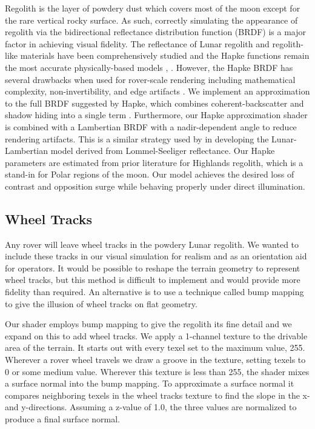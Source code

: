 \documentclass[twocolumn,letterpaper]{IEEEAerospaceCLS}  %
\begin{document}
Regolith is the layer of powdery dust which covers most of the moon except for the rare vertical rocky surface.  
As such, correctly simulating the appearance of regolith via the bidirectional reflectance distribution function (BRDF) is a major factor in achieving visual fidelity.  
The reflectance of Lunar regolith and regolith-like materials have been comprehensively studied and the Hapke functions remain the most accurate physically-based models \cite{Shepard2007}, \cite{hapke2012wavelength}.  
However, the Hapke BRDF has several drawbacks when used for rover-scale rendering including mathematical complexity, non-invertibility, and edge artifacts \cite{Wong2012}.  We implement an approximation to the full BRDF suggested by Hapke, which combines coherent-backscatter and shadow hiding into a single term \cite{hapke2012wavelength}.  
Furthermore, our Hapke approximation shader is combined with a Lambertian BRDF with a nadir-dependent angle to reduce rendering artifacts.  
This is a similar strategy used by \cite{McEwen1996} in developing the Lunar-Lambertian model derived from Lommel-Seeliger reflectance.  
Our Hapke parameters are estimated from prior literature for Highlands regolith, which is a stand-in for Polar regions of the moon.  
Our model achieves the desired loss of contrast and opposition surge while behaving properly under direct illumination. 

\subsection{Wheel Tracks}
Any rover will leave wheel tracks in the powdery Lunar regolith.  We wanted to include these tracks in our visual simulation for realism and as an orientation aid for operators.  
It would be possible to reshape the terrain geometry to represent wheel tracks, but this method is difficult to implement and would provide more fidelity than required.
An alternative is to use a technique called bump mapping to give the illusion of wheel tracks on flat geometry.

Our shader employs bump mapping to give the regolith its fine detail and we expand on this to add wheel tracks.  
We apply a 1-channel texture to the drivable area of the terrain.
It starts out with every texel set to the maximum value, 255.  
Wherever a rover wheel travels we draw a groove in the texture, setting texels to 0 or some medium value.
Wherever this texture is less than 255, the shader mixes a surface normal into the bump mapping.  
To approximate a surface normal it compares neighboring texels in the wheel tracks texture to find the slope in the x- and y-directions.  
Assuming a z-value of 1.0, the three values are normalized to produce a final surface normal.
\end{document}
